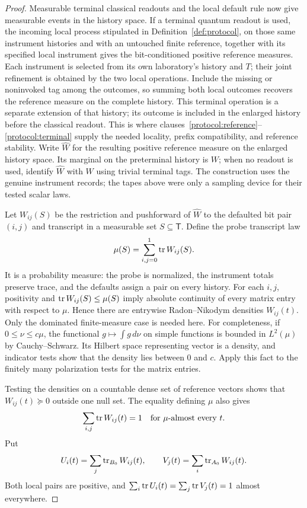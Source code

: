 \begin{proof}
Measurable terminal classical readouts and the local default rule now
give measurable events in the history space.  If a terminal quantum
readout is used, the incoming local process stipulated in
Definition~\ref{def:protocol}, on those same instrument histories and
with an untouched finite reference, together with its specified local
instrument gives the bit-conditioned positive reference measures.
Each instrument is selected from its own laboratory's history and $T$;
their joint refinement is obtained by the two local operations.  Include
the missing or noninvoked tag among the outcomes, so summing both local
outcomes recovers the reference measure on the complete history.  This
terminal operation is a separate extension of that history; its outcome is
included in the enlarged history before the classical readout.  This is where
clauses~\ref{protocol:reference}--\ref{protocol:terminal} supply the needed
locality, prefix compatibility, and reference stability.  Write
$\widehat W$ for the resulting positive reference measure on the enlarged
history space.  Its marginal on the preterminal history is $W$; when no
readout is used, identify $\widehat W$ with $W$ using trivial terminal tags.
The construction uses the genuine
instrument records; the tapes above were only a sampling device for
their tested scalar laws.

Let $W_{ij}(S)$ be the restriction and pushforward of $\widehat W$ to
the defaulted bit pair $(i,j)$ and transcript in a measurable set
$S\subseteq\mathsf T$.  Define the probe transcript law
\[
 \mu(S)=\sum_{i,j=0}^1\operatorname{tr} W_{ij}(S).
\]
It is a probability measure: the probe is normalized, the instrument
totals preserve trace, and the defaults assign a pair on every history.
For each $i,j$, positivity and $\operatorname{tr} W_{ij}(S)\le\mu(S)$ imply absolute
continuity of every matrix entry with respect to $\mu$.  Hence there
are entrywise Radon--Nikodym densities $W_{ij}(t)$.  Only the dominated
finite-measure case is needed here.  For completeness, if
$0\le\nu\le c\mu$, the functional $g\mapsto\int g\,d\nu$ on simple
functions is bounded in $L^2(\mu)$ by Cauchy--Schwarz.  Its Hilbert
space representing vector is a density, and indicator tests show that
the density lies between $0$ and $c$.  Apply this fact to the finitely
many polarization tests for the matrix entries.

Testing the densities on a countable dense set of reference vectors
shows that $W_{ij}(t)\succeq0$ outside one null set.  The equality
defining $\mu$ also gives
\[
 \sum_{i,j}\operatorname{tr} W_{ij}(t)=1\quad\text{for $\mu$-almost every }t.
\]
Put
\[
 U_i(t)=\sum_j\operatorname{tr}_{B_0}W_{ij}(t),
 \qquad
 V_j(t)=\sum_i\operatorname{tr}_{A_0}W_{ij}(t).
\]
Both local pairs are positive, and
$\sum_i\operatorname{tr} U_i(t)=\sum_j\operatorname{tr} V_j(t)=1$ almost everywhere.


\end{proof}
